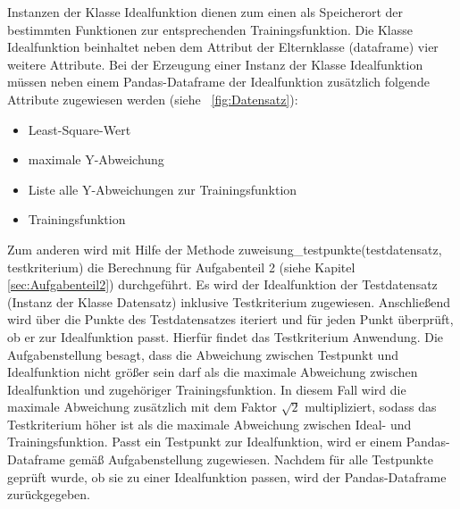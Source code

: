 \documentclass[
    a4paper, 								%
    oneside, 								%
    11pt, 									%
    listof=totoc, 					%
    bibliography=totoc, 		%
    final, 									%
    numbers=noenddot
]{scrreprt}
\newcommand{\abbildung}[1]{\figurename\ \ref{#1}}
\begin{document}
Instanzen der Klasse Idealfunktion dienen zum einen als Speicherort der bestimmten Funktionen zur entsprechenden Trainingsfunktion. Die Klasse Idealfunktion beinhaltet neben dem Attribut der Elternklasse (dataframe) vier weitere Attribute. Bei der Erzeugung einer Instanz der Klasse Idealfunktion müssen neben einem Pandas-Dataframe der Idealfunktion zusätzlich folgende Attribute zugewiesen werden (siehe \abbildung{fig:Datensatz}):
\begin{itemize}
\item Least-Square-Wert
\item maximale Y-Abweichung
\item Liste alle Y-Abweichungen zur Trainingsfunktion
\item Trainingsfunktion  
\end{itemize}
Zum anderen wird mit Hilfe der Methode zuweisung\_testpunkte(testdatensatz, testkriterium) die Berechnung für Aufgabenteil 2 (siehe Kapitel \ref{sec:Aufgabenteil2}) durchgeführt. Es wird der Idealfunktion der Testdatensatz (Instanz der Klasse Datensatz) inklusive Testkriterium zugewiesen. Anschließend wird über die Punkte des Testdatensatzes iteriert und für jeden Punkt überprüft, ob er zur Idealfunktion passt. Hierfür findet das Testkriterium Anwendung. Die Aufgabenstellung besagt, dass die Abweichung zwischen Testpunkt und Idealfunktion nicht größer sein darf als die maximale Abweichung zwischen Idealfunktion und zugehöriger Trainingsfunktion. In diesem Fall wird die maximale Abweichung zusätzlich mit dem Faktor $\sqrt{2}$ multipliziert, sodass das Testkriterium höher ist als die maximale Abweichung zwischen Ideal- und Trainingsfunktion. Passt ein Testpunkt zur Idealfunktion, wird er einem Pandas-Dataframe gemäß Aufgabenstellung zugewiesen. Nachdem für alle Testpunkte geprüft wurde, ob sie zu einer Idealfunktion passen, wird der Pandas-Dataframe zurückgegeben. 
\end{document}
